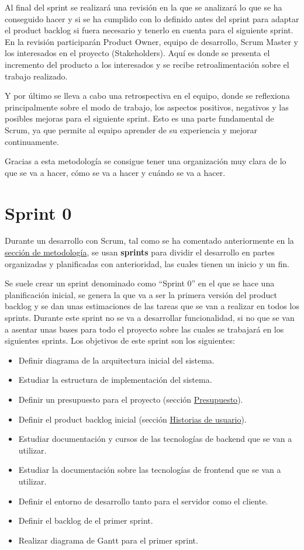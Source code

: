 Al final del sprint se realizará una revisión en la que se analizará lo que se ha conseguido hacer y si se ha cumplido con lo definido antes del sprint para adaptar el product backlog si fuera necesario y tenerlo en cuenta para el siguiente sprint. En la revisión participarán Product Owner, equipo de desarrollo, Scrum Master y los interesados en el proyecto (Stakeholders). Aquí es donde se presenta el incremento del producto a los interesados y se recibe retroalimentación sobre el trabajo realizado.

Y por último se lleva a cabo una retrospectiva en el equipo, donde se reflexiona principalmente sobre el modo de trabajo, los aspectos positivos, negativos y las posibles mejoras para el siguiente sprint. Esto es una parte fundamental de Scrum, ya que permite al equipo aprender de su experiencia y mejorar continuamente.

Gracias a esta metodología se consigue tener una organización muy clara de lo que se va a hacer, cómo se va a hacer y cuándo se va a hacer.

\section{Sprint 0}
\label{sec:planificacion-inicial}
Durante un desarrollo con Scrum, tal como se ha comentado anteriormente en la \hyperref[sec:metodologia]{sección de metodología}, se usan \textbf{sprints} para dividir el desarrollo en partes organizadas y planificadas con anterioridad, las cuales tienen un inicio y un fin.

Se suele crear un sprint denominado como ``Sprint 0'' en el que se hace una planificación inicial, se genera la que va a ser la primera versión del product backlog y se dan unas estimaciones de las tareas que se van a realizar en todos los sprints.
Durante este sprint no se va a desarrollar funcionalidad, si no que se van a asentar unas bases para todo el proyecto sobre las cuales se trabajará en los siguientes sprints.
Los objetivos de este sprint son los siguientes:

\begin{itemize}
    \item Definir diagrama de la arquitectura inicial del sistema.
    \item Estudiar la estructura de implementación del sistema.
    \item Definir un presupuesto para el proyecto (sección \hyperref[sec:presupuesto]{Presupuesto}).
    \item Definir el product backlog inicial (sección \hyperref[sec:historias-de-usuario]{Historias de usuario}).
    \item Estudiar documentación y cursos de las tecnologías de backend que se van a utilizar.
    \item Estudiar la documentación sobre las tecnologías de frontend que se van a utilizar.
    \item Definir el entorno de desarrollo tanto para el servidor como el cliente.
    \item Definir el backlog de el primer sprint.
    \item Realizar diagrama de Gantt para el primer sprint.
\end{itemize}

